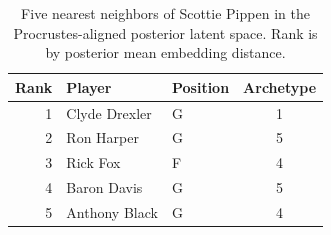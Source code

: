 \begin{table}[htbp]
  \centering\small
  \begin{tabular}{rllc}
    \toprule
    Rank & Player & Position & Archetype \\
    \midrule
    1 & Clyde Drexler & G & 1 \\
    2 & Ron Harper & G & 5 \\
    3 & Rick Fox & F & 4 \\
    4 & Baron Davis & G & 5 \\
    5 & Anthony Black & G & 4 \\
    \bottomrule
  \end{tabular}
  \caption{Five nearest neighbors of Scottie Pippen in the Procrustes-aligned posterior latent space. Rank is by posterior mean embedding distance.}
  \label{tab:Scottie_Pippen_neighbors}
\end{table}

